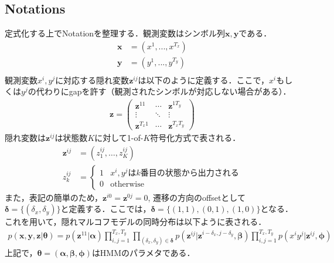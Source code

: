 \subsection{Notations}
\label{subsec:phmm_nt}
定式化する上でNotationを整理する．観測変数はシンボル列$\bm{x}, \bm{y}$である．
\begin{align}
\bm{x}&=(x^1,...,x^{T_x})\\
\bm{y}&=(y^1,...,y^{T_y})\\
\end{align}
観測変数$x^i, y^j$に対応する隠れ変数$\bm{z}^{ij}$は以下のように定義する．ここで，$x^i$もしくは$y^j$の代わりにgapを許す（観測されたシンボルが対応しない場合がある）．
\begin{align}
\bm{z} = 
\begin{pmatrix}
\bm{z}^{11}  & \cdots & \bm{z}^{1 T_y} \\
\vdots  & \ddots & \vdots \\
\bm{z}^{T_x 1}& \cdots & \bm{z}^{T_x T_y}
\end{pmatrix}
\end{align}
隠れ変数は$\bm{z}^{ij}$は状態数$K$に対して1-of-$K$符号化方式で表される．
\begin{align}
\bm{z}^{ij} &= (z^{ij}_1,\ldots,z_K^{ij})\\
z_k^{ij} &= \left\{
\begin{array}{ll}
1 & \mbox{$x^i, y^j$は$k$番目の状態から出力される}\\
0 & \mbox{otherwise}
\end{array}
\right.
\end{align}
また，表記の簡単のため，$\bm{z}^{i0}=\bm{z}^{0j}=0$, 遷移の方向のoffsetとして$\bm{\delta}=\{(\delta_x, \delta_y)\}$と定義する．ここでは，$\bm{\delta}=\{(1,1),(0,1),(1,0)\}$となる．
これを用いて，隠れマルコフモデルの同時分布は以下ように表される．
\begin{align}
  p(\bm{x},\bm{y}, \bm{z}|\bm{\theta})=
p(\bm{z}^{11}|\bm{\alpha})
\prod^{T_x,T_y}_{i,j=1} \prod_{(\delta_x, \delta_y) \in \bm{\delta}}
 p(\bm{z}^{ij}|\bm{z}^{i-\delta_x, j-\delta_y}, \bm{\beta})
\prod^{T_x,T_y}_{i,j=1}
  p(x^i y^j|\bm{z}^{ij}, \bm{\phi})
\end{align}
上記で，$\bm{\theta}=(\bm{\alpha},\bm{\beta},\bm{\phi})$はHMMのパラメタである．
